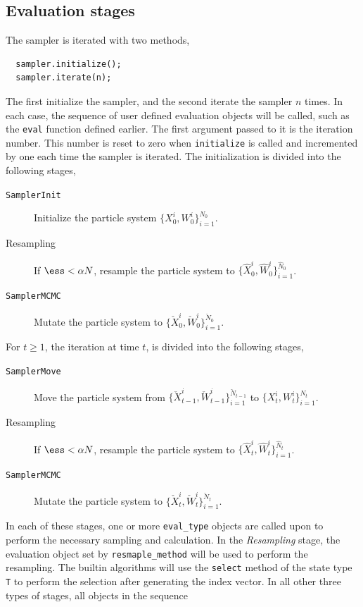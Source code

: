 \subsection{Evaluation stages}
\label{sub:Evaluation stages}

The sampler is iterated with two methods,
\begin{Verbatim}
  sampler.initialize();
  sampler.iterate(n);
\end{Verbatim}
The first initialize the sampler, and the second iterate the sampler $n$ times.
In each case, the sequence of user defined evaluation objects will be called,
such as the \verb|eval| function defined earlier. The first argument passed to
it is the iteration number. This number is reset to zero when \verb|initialize|
is called and incremented by one each time the sampler is iterated. The
initialization is divided into the following stages,
\begin{description}
  \item[\texttt{SamplerInit}] Initialize the particle system
    $\{X_0^i,W_0^i\}_{i=1}^{N_0}$.
  \item[Resampling] If $\ess < \alpha N$, resample the particle system to
    $\{\hat{X}_0^i,\hat{W}_0^i\}_{i=1}^{\hat{N}_0}$.
  \item[\texttt{SamplerMCMC}] Mutate the particle system to
    $\{\check{X}_0^i,\check{W}_0^i\}_{i=1}^{\check{N}_0}$.
\end{description}
For $t\ge1$, the iteration at time $t$, is divided into the following stages,
\begin{description}
  \item[\texttt{SamplerMove}] Move the particle system from
    $\{\check{X}_{t-1}^i,\check{W}_{t-1}^i\}_{i=1}^{\check{N}_{t-1}}$ to
    $\{X_t^i,W_t^i\}_{i=1}^{N_t}$.
  \item[Resampling] If $\ess < \alpha N$, resample the particle system to
    $\{\hat{X}_t^i,\hat{W}_t^i\}_{i=1}^{\hat{N}_t}$.
  \item[\texttt{SamplerMCMC}] Mutate the particle system to
    $\{\check{X}_t^i,\check{W}_t^i\}_{i=1}^{\check{N}_t}$.
\end{description}
In each of these stages, one or more \verb|eval_type| objects are called upon
to perform the necessary sampling and calculation. In the \emph{Resampling}
stage, the evaluation object set by \verb|resmaple_method| will be used to
perform the resampling. The builtin algorithms will use the \verb|select|
method of the state type \verb|T| to perform the selection after generating the
index vector. In all other three types of stages, all objects in the sequence
